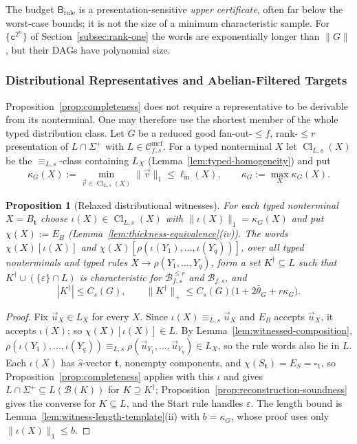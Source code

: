 \documentclass[11pt]{article}
\numberwithin{equation}{section}
\theoremstyle{plain}
\newtheorem{proposition}[theorem]{Proposition}
\theoremstyle{definition}
\theoremstyle{remark}
\newcommand{\Cmcf}[2]{\mathcal{C}^{\mathrm{mcf}}_{#1,#2}}
\newcommand{\tuple}[1]{\vec{#1}}
\newcommand{\blank}{\square}
\newcommand{\eps}{\varepsilon}
\theoremstyle{plain}
\begin{document}
The budget $\mathsf B_{\mathrm{rule}}$ is a presentation-sensitive \emph{upper
certificate}, often far below the worst-case bounds; it is not the size of a
minimum characteristic sample.  For $\{\mathtt c^{2^n}\}$ of
Section~\ref{subsec:rank-one} the words are exponentially longer than $\|G\|$, but
their DAGs have polynomial size.

\subsubsection{Distributional Representatives and Abelian-Filtered Targets}
\label{subsec:short-distributional-representatives}

Proposition~\ref{prop:completeness} does not require a representative to be
derivable from its nonterminal.  One may therefore use the shortest member of the
whole typed distribution class.  Let $G$ be a reduced good fan-out-$\le f$,
rank-$\le r$ presentation of $L\cap\Sigma^+$ with $L\in\Cmcf{f}{s}$.  For a typed
nonterminal $X$ let $\operatorname{Cl}_{L,s}(X)$ be the $\equiv_{L,s}$-class containing $L_X$
(Lemma~\ref{lem:typed-homogeneity}) and put
\[
 \kappa_G(X):=\min_{\tuple v\in\operatorname{Cl}_{L,s}(X)}\|\tuple v\|_1\le\ell_{\mathrm{in}}(X),\qquad
 \kappa_G:=\max_X\kappa_G(X).
\]

\begin{proposition}[Relaxed distributional witnesses]
\label{prop:mcfg-relaxed-witnesses}
For each typed nonterminal $X=B_{\mathbf t}$ choose $\iota(X)\in\operatorname{Cl}_{L,s}(X)$ with
$\|\iota(X)\|_1=\kappa_G(X)$ and put $\chi(X):=E_B$
(Lemma~\ref{lem:thickness-equivalence}(iv)).  The words $\chi(X)[\iota(X)]$ and
$\chi(X)[\rho(\iota(Y_1),\ldots,\iota(Y_q))]$, over all typed nonterminals and
typed rules $X\to\rho(Y_1,\ldots,Y_q)$, form a set $K^\dagger\subseteq L$ such that
$K^\dagger\cup(\{\eps\}\cap L)$ is characteristic for $\mathcal B^{\le r}_{f,s}$ and
$\mathcal B_{f,s}$, and
\[
 |K^\dagger|\le C_s(G),\qquad
 \|K^\dagger\|_+\le C_s(G)\bigl(1+2\bar\theta_G+r\kappa_G\bigr).
\]
\end{proposition}

\begin{proof}
Fix $\tuple u_X\in L_X$ for every $X$.  Since $\iota(X)\equiv_{L,s}\tuple u_X$ and
$E_B$ accepts $\tuple u_X$, it accepts $\iota(X)$; so
$\chi(X)[\iota(X)]\in L$.  By Lemma~\ref{lem:witnessed-composition},
$\rho(\iota(Y_1),\ldots,\iota(Y_q))\equiv_{L,s}\rho(\tuple u_{Y_1},\ldots,
\tuple u_{Y_q})\in L_X$, so the rule words also lie in $L$.  Each $\iota(X)$ has
$\widehat s$-vector $\mathbf t$, nonempty components, and $\chi(S_{\mathbf t})=
E_S=\blank_1$, so Proposition~\ref{prop:completeness} applies with this $\iota$
and gives $L\cap\Sigma^+\subseteq L(\mathcal B(K))$ for $K\supseteq K^\dagger$;
Proposition~\ref{prop:reconstruction-soundness} gives the converse for
$K\subseteq L$, and the Start rule handles $\eps$.  The length bound is
Lemma~\ref{lem:witness-length-template}(ii) with $b=\kappa_G$, whose proof uses only
$\|\iota(X)\|_1\le b$.
\end{proof}
\end{document}
